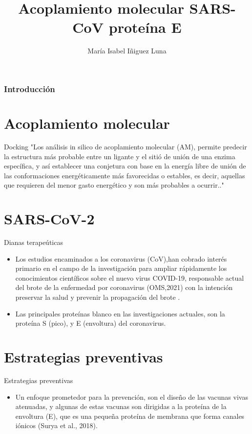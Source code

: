 \documentclass[9pt]{beamer}
\title{Acoplamiento molecular SARS-CoV proteína E}
\subtitle{}
\author{María Isabel Iñiguez Luna }
\institute{Centro de Investigaciones Cerebrales}
\begin{document}
\titlepage

\begin{frame}

 \frametitle{Introducción}
 \tableofcontents
\end{frame}

\section{Acoplamiento molecular} %
\begin{frame}{Docking}%
"Los análisis in silico de acoplamiento molecular (AM), permite predecir la estructura más probable entre un ligante y el sitió de unión de una enzima específica, y así establecer una conjetura con base en la energía libre de unión de las conformaciones energéticamente más favorecidas o estables, es decir, aquellas que requieren del menor gasto energético y son más probables a ocurrir.."
    
\end{frame}

\section{SARS-CoV-2}
\begin{frame}{Dianas terapeúticas}
\begin{itemize}

  \setlength\itemsep{1em}  %
  
    \item Los estudios encaminados a los coronavirus (CoV),han cobrado interés primario en el campo de la investigación para ampliar rápidamente los conocimientos científicos sobre el nuevo virus COVID-19, responsable actual del brote de la enfermedad por coronavirus (OMS,2021) con la intención preservar la salud y prevenir la propagación del brote . 
    
    \item Las principales proteínas blanco en las investigaciones actuales, son la proteína S (pico), y E (envoltura) del coronavirus.
\end{itemize}
\end{frame}

\section{Estrategias preventivas}
\begin{frame}{Estrategias preventivas}
\begin{itemize}

  \setlength\itemsep{1em}  %
  
    \item Un enfoque prometedor para la prevención, son el diseño de las vacunas vivas atenuadas, y algunas de estas vacunas son dirigidas a la proteína de la envoltura (E), que es una pequeña proteína de membrana que forma canales iónicos (Surya et al., 2018). 
    \end{itemize}
\end{frame}
\end{document}

